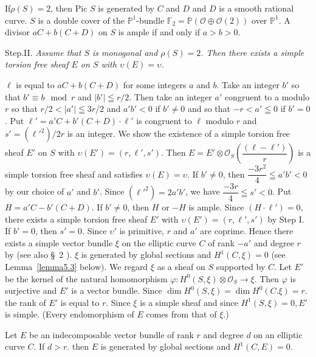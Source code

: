 If\pageoriginale $\rho(S)=2$, then Pic $S$ is generated by $C$ and $D$ and $D$ is a
smooth rational curve. $S$ is a double cover of the
$\mathbb{P}^{1}$-bundle
$\mathbb{F}_2=\mathbb{P}(\mathscr{O}\oplus \mathscr{O}(2))$ over
$\mathbb{P}^{1}$. A divisor $aC+b(C+D)$ on $S$ is ample if and only if
$a>b>0$.  

Step.II. \textit{Assume that $S$ is monogonal and $\rho(S)=2$. Then
there exists a simple torsion free sheaf $E$ on $S$ with $\upsilon(E)=\upsilon$.}

\begin{Proof}
$\ell$ is equal to $aC+b(C+D)$ for some integers $a$ and $b$. Take an
integer $b'$ so that $b'\equiv b \mod r$  and $|b'| \leqq
r/2$. Then take an integer $a'$ congruent to a modulo $r$ so that
$r/2< |a'|\leqq 3r/2$ and $a' b'<0$ if $b'\neq 0$ and so that
$-r<a'\leqq 0$ if $b'=0$. Put $\ell'=a'C+b'(C+D)\cdot \ell'$ is
congruent to $\ell$ modulo $r$ and $s'=\left({\ell'}^{2}\right)/2r$ is
an integer. We show the existence of a simple torsion free sheaf $E'$
on $S$ with $\upsilon(E')=(r,\ell',s')$. Then
$E=E'\otimes \mathscr{O}_S\left(\dfrac{(\ell-\ell')}{r}\right)$ is a
simple torsion free sheaf and satisfies $\upsilon(E)=\upsilon$. If
$b'\neq 0$, then $\dfrac{-3r^{2}}{4}\leqq a' b'<0$ by our choice of
$a'$ and $b'$. Since $\left(\ell'^{2}\right)=2a' b'$,  we have
$\dfrac{-3r}{4}\leqq s'<0$. Put $H=a'C-b'(C+D)$. If $b'\neq 0$, then
$H$ or $-H$ is ample. Since $(H\cdot\ell')=0$, there exists a simple
torsion free sheaf $E'$ with $\upsilon(E')=(r,\ell',s')$ by Step I. If
$b'=0$, then $s'=0$. Since $\upsilon'$ is primitive, $r$ and $a'$ are
coprime. Hence there exists a simple vector bundle $\xi$ on the
elliptic curve $C$ of rank $-a'$ and degree $r$ by \cite{key1} (see
also \S\ 2 \cite{key18}). $\xi$ is generated by global sections and
$H^{1}(C,\xi)=0$ (see Lemma~\ref{lemma5.3} below). We regard $\xi$ as
a sheaf on $S$ supported by $C$. Let $E'$ be the kernel of the natural
homomorphism $\varphi:H^{0}(S,\xi)\otimes \mathscr{O}_{S}\to \xi$. 
Then $\varphi$ is
surjective and $E'$ is a vector bundle. Since $\dim H^{0}(S,\xi)=\dim
H^{0}(C.\xi)=r$. the rank of $E'$ is equal to $r$. Since $\xi$ is a
simple sheaf and since $H^{1}(S,\xi)=0,E'$\pageoriginale is simple. (Every
endomorphism of $E$ comes from that of $\xi$.)
\enprf
\end{Proof}

\begin{lemma}\label{lemma5.3}
Let $E$ be an indecomposable  vector bundle of rank $r$ and degree $d$
on an elliptic curve $C$. If $d>r$. then $E$ is generated by global
sections and $H^{1}(C,E)=0$.
\end{lemma}

